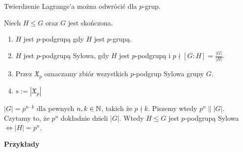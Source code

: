 \begin{corollary}
Twierdzenie Lagrange'a można odwrócić dla $p$-grup. 
\end{corollary}
\begin{definition}
	Niech $H\le G$ oraz $G$ jest skończona.
	\begin{enumerate}[label=\arabic*.]
		\item $H$ jest $p$-podgrupą gdy $H$ jest $p$-grupą.
		\item $H$ jest $p$-podgrupą Sylowa, gdy $H$ jest $p$-podgrupą i $p\nmid \left[ G:H \right] = \frac{|G|}{|H|} $.
		\item Przez $\mathfrak{X}_{p}$ oznaczamy zbiór wszystkich $p$-podgrup Sylowa grupy $G$.
		\item $s:= \left| \mathfrak{X}_{p} \right| $
	\end{enumerate}
\end{definition} 
\begin{remark}
	$\left| G \right| = p^{n\cdot k}$ dla pewnych $n,k\in \mathbb{N}$, takich że $p\nmid k$. Piszemy wtedy $p^{n}\parallel \left| G \right| $. Czytamy to, że $p^{n}$ dokładnie dzieli $\left| G \right| $. Wtedy $H\le G$ jest $p $-podgrupą Sylowa $\iff \left| H \right| = p^{n}$.
\end{remark} 

\textbf{Przykłady}

